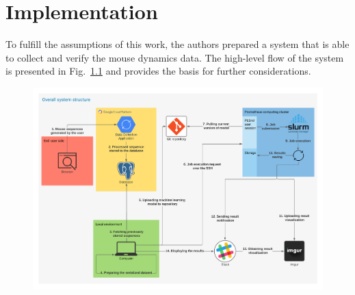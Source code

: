 \chapter{Implementation}\label{ch:implementation}
To fulfill the assumptions of this work, the authors prepared a system that is able to collect and verify the mouse dynamics data.
The high-level flow of the system is presented in Fig.~\ref{fig:overall_system_structure} and provides the basis for further considerations.
\begin{figure}[!hbt]
    \includegraphics[width=\linewidth]{resources/overall_diagram.png}
    \label{fig:overall_system_structure}
\end{figure}

